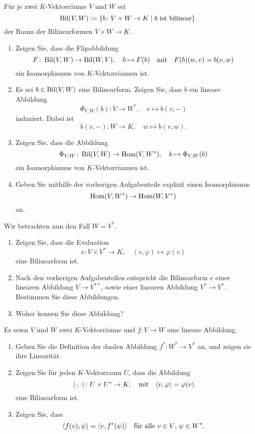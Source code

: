 \documentclass[a4paper,10pt]{scrartcl}
\begin{document}
\begin{question}
  Für je zwei $K$-Vektorräume $V$ und $W$ sei
  \[
              \operatorname{Bil}(V, W)
    \coloneqq \{b \colon V \times  W \to K \mid \text{$b$ ist bilinear}\}
  \]
  der Raum der Bilinearformen $V \times W \to K$.
  \begin{enumerate}
    \item
      Zeigen Sie, dass die Flipabbildung
      \[
        F \colon \operatorname{Bil}(V, W) \to \operatorname{Bil}(W, V),
        \quad
        b \mapsto F(b)
        \quad\text{mit}\quad
        F(b)(w,v) = b(v,w)
      \]
      ein Isomorphismus von $K$-Vektorräumen ist.
    \item
      Es sei $b \in \operatorname{Bil}(V, W)$ eine Bilinearform.
      Zeigen Sie, dass $b$ ein lineare Abbildung
      \[
        \Phi_{V,W}(b) \colon V \to W^*,
        \quad
        v \mapsto b(v, -)
      \]
      induziert.
      Dabei ist
      \[
        b(v, -) \colon W \to K,
        \quad
        w \mapsto b(v,w).
      \]
    \item
      Zeigen Sie, dass die Abbildung
      \[
        \Phi_{V,W} \colon \operatorname{Bil}(V, W) \to \operatorname{Hom}(V, W^*),
        \quad
        b \mapsto \Phi_{V,W}(b)
      \]
      ein Isomorphismus von $K$-Vektorräumen ist.
    \item
      Geben Sie mithilfe der vorherigen Aufgabenteile explizit einen Isomorphismus
      \[
        \operatorname{Hom}(V, W^*) \to \operatorname{Hom}(W, V^*)
      \]
      an.
  \end{enumerate}
  Wir betrachten nun den Fall $W = V^*$.
  \begin{enumerate}[resume]
    \item
      Zeigen Sie, dass die Evaluation
      \[
        e \colon V \times V^* \to K,
        \quad
        (v, \varphi) \mapsto \varphi(v)
      \]
      eine Bilinearform ist.
   \item
      Nach den vorherigen Aufgabenteilen entspricht die Bilinearform $e$ einer linearen Abbildung $V \to V^{**}$, sowie einer linearen Abbildung $V^* \to V^*$.
      Bestimmen Sie diese Abbildungen.
    \item
      Woher kennen Sie diese Abbildung?
  \end{enumerate}
\end{question}


\begin{question}
  Es seien $V$ und $W$ zwei $K$-Vektorräume und $f \colon V \to W$ eine lineare Abbildung.
  \begin{enumerate}
    \item
      Geben Sie die Definition der dualen Abbildung $f^* \colon W^* \to V^*$ an, und zeigen sie ihre Linearität.
    \item
      Zeigen Sie für jeden $K$-Vektorraum $U$, dass die Abbildung
      \[
        \langle \cdot, \cdot \rangle \colon U \times U^* \to K,
        \quad\text{mit}\quad
        \langle v, \varphi \rangle = \varphi(v)
      \]
      eine Bilinearform ist.
    \item
      Zeigen Sie, dass
      \[
        \langle f(v), \psi \rangle = \langle v, f^*(\psi) \rangle
        \quad
        \text{für alle $v \in V$, $\psi \in W^*$}.
      \]
  \end{enumerate}
\end{question}
\end{document}
